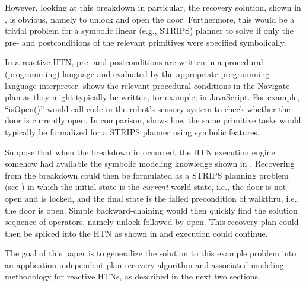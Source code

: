 \documentclass{llncs}
\begin{document}
However, looking at this breakdown in particular, the recovery
solution, shown in , is obvious, namely to unlock and
open the door.  Furthermore, this would be a trivial problem for a
symbolic linear (e.g., STRIPS) planner to solve if only the pre-
and postconditions of the relevant primitives were specified
symbolically.

In a reactive HTN, pre- and postconditions are written in a procedural
(programming) language and evaluated by the appropriate programming
language interpreter.   shows the relevant procedural
conditions in the Navigate plan as they might typically be written,
for example, in JavaScript.  For example, ``isOpen()'' would call code in
the robot's sensory system to check whether the door is currently
open.  In comparison,  shows how the same primitive
tasks would typically be formalized for a STRIPS planner using
symbolic features.

Suppose that when the breakdown in  occurred, the HTN
execution engine somehow had available the symbolic modeling
knowledge shown in .  Recovering from the breakdown
could then be formulated as a STRIPS planning problem (see
) in which the initial state is the \emph{current} world
state, i.e., the door is not open and is locked, and the final state is
the failed precondition of walkthru, i.e., the door is open.
Simple backward-chaining would then quickly find the solution sequence of
operators, namely unlock followed by open.  This recovery plan could
then be spliced into the HTN as shown in  and execution
could continue.

The goal of this paper is to generalize the solution to this example
problem into an application-independent plan recovery algorithm and
associated modeling methodology for reactive HTNs, as described in the
next two sections.
\end{document}
